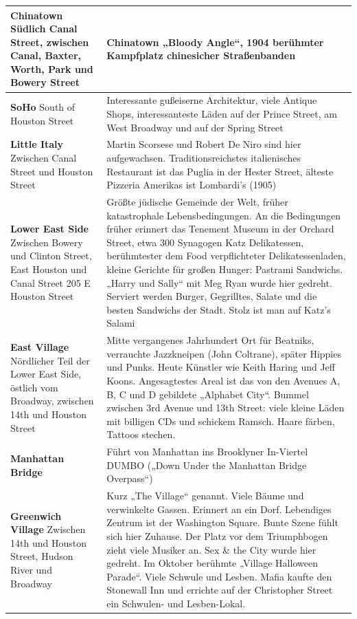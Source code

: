 \documentclass[fontsize=14pt,a4paper,headinclude,DIV=calc,automark]{scrbook}
\begin{document}
{\begin{longtable}{
    >{\raggedright\arraybackslash\columncolor{tablecellblue}}p{5.1cm}
    >{\raggedright\arraybackslash\columncolor{rightcolumn}}p{10cm}
    }
    \textbf{Chinatown}\newline
    Südlich Canal Street, zwischen Canal, Baxter, Worth, Park und Bowery Street & Chinatown „Bloody Angle“, 1904 berühmter Kampfplatz chinesicher Straßenbanden \\ \midrule
    \textbf{SoHo}\newline
    South of Houston Street & Interessante gußeiserne Architektur, viele Antique Shops, interessanteste Läden auf der Prince Street, am West Broadway und auf der Spring Street \\ \midrule
    \textbf{Little Italy}\newline
    Zwischen Canal Street und Houston Street & Martin Scorsese und Robert De Niro sind hier aufgewachsen. Traditionsreichstes italienisches Restaurant ist das Puglia in der Hester Street, älteste Pizzeria Amerikas ist Lombardi’s (1905) \\ \midrule
    \textbf{Lower East Side}\newline
    Zwischen Bowery und Clinton Street, East Houston und Canal Street 205 E Houston Street & Größte jüdische Gemeinde der Welt, früher katastrophale Lebensbedingungen. An die Bedingungen früher erinnert das Tenement Museum in der Orchard Street, etwa 300 Synagogen \newline
    Katz Delikatessen, berühmtester dem Food verpflichteter Delikatessenladen, kleine Gerichte für großen Hunger: Pastrami Sandwichs. „Harry und Sally“ mit Meg Ryan wurde hier gedreht. Serviert werden Burger, Gegrilltes, Salate und die besten Sandwichs der Stadt. Stolz ist man auf Katz’s Salami \\ \midrule
    \textbf{East Village}\newline
    Nördlicher Teil der Lower East Side, östlich vom Broadway, zwischen 14th und Houston Street & Mitte vergangenes Jahrhundert Ort für Beatniks, verrauchte Jazzkneipen (John Coltrane), später Hippies und Punks. Heute Künstler wie Keith Haring und Jeff Koons. Angesagtestes Areal ist das von den Avenues A, B, C und D gebildete „Alphabet City“. Bummel zwischen 3rd Avenue und 13th Street: viele kleine Läden mit billigen CDs und schickem Ramsch. Haare färben, Tattoos stechen. \\ \midrule
    \textbf{Manhattan Bridge}\newline
     & Führt von Manhattan ins Brooklyner In-Viertel DUMBO („Down Under the Manhattan Bridge Overpass“) \\ \midrule
    \textbf{Greenwich Village}\newline
    Zwischen 14th und Houston Street, Hudson River und Broadway & Kurz „The Village“ genannt. Viele Bäume und verwinkelte Gassen. Erinnert an ein Dorf. Lebendiges Zentrum ist der Washington Square. Bunte Szene fühlt sich hier Zuhause. Der Platz vor dem Triumphbogen zieht viele Musiker an. Sex \& the City wurde hier gedreht. Im Oktober berühmte „Village Halloween Parade“. Viele Schwule und Lesben. Mafia kaufte den Stonewall Inn und errichte auf der Christopher Street ein Schwulen- und Lesben-Lokal. \\ \midrule

\end{longtable}}
\end{document}
